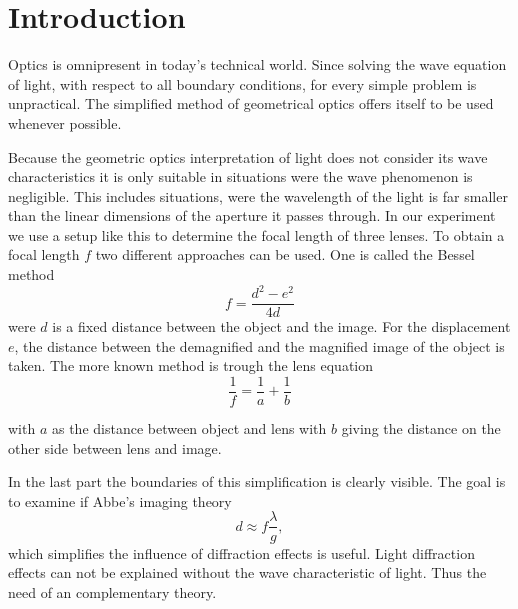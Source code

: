 \section{Introduction}
Optics is omnipresent in today's technical world.
Since solving the wave equation of light, with respect to all boundary conditions, for every simple problem is unpractical.
The simplified method of geometrical optics offers itself to be used whenever possible.

Because the geometric optics interpretation of light does not consider its wave characteristics it is only suitable in situations were the wave phenomenon is negligible.
This includes situations, were the wavelength of the light is far smaller than the linear dimensions of the aperture it passes through. 
In our experiment we use a setup like this to determine the focal length of three lenses. 
To obtain a focal length $f$ two different approaches can be used.
One is called the Bessel method\cite{manual1}
\begin{equation}
f = \frac{d^2 - e^2}{4d}
\label{eq::bessel}
\end{equation}
were $d$ is a fixed distance between the object and the image.
For the displacement $e$, the distance between the demagnified and the magnified image of the object is taken.
The more known method is trough the lens equation\cite{manual2} 
\begin{equation}
\frac{1}{f} = \frac{1}{a} + \frac{1}{b}
\label{eq::lens}
\end{equation}

with $a$ as the distance between object and lens with $b$ giving the distance on the other side between lens and image.

In the last part the boundaries of this simplification is clearly visible. 
The goal is to examine if Abbe's imaging theory\cite{manual3}
\begin{equation}
d \approx f\frac{\lambda}{g},
\label{eq::diff}
\end{equation}
which simplifies the influence of diffraction effects is useful. 
Light diffraction effects can not be explained without the wave characteristic of light.
Thus the need of an complementary theory.
